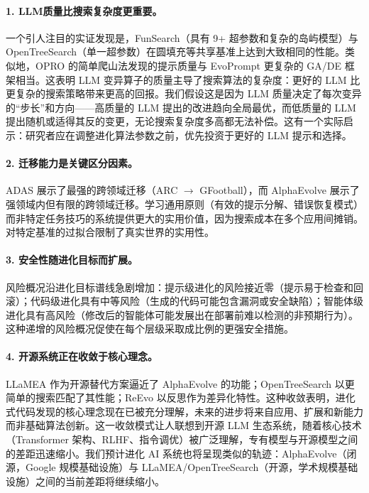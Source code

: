 \paragraph{1. LLM质量比搜索复杂度更重要。}
一个引人注目的实证发现是，FunSearch（具有 9+ 超参数和复杂的岛屿模型）与 OpenTreeSearch（单一超参数）在圆填充等共享基准上达到大致相同的性能。类似地，OPRO 的简单爬山法发现的提示质量与 EvoPrompt 更复杂的 GA/DE 框架相当。这表明 LLM 变异算子的质量主导了搜索算法的复杂度：更好的 LLM 比更复杂的搜索策略带来更高的回报。我们假设这是因为 LLM 质量决定了每次变异的``步长''和方向——高质量的 LLM 提出的改进趋向全局最优，而低质量的 LLM 提出随机或适得其反的变更，无论搜索复杂度多高都无法补偿。这有一个实际启示：研究者应在调整进化算法参数之前，优先投资于更好的 LLM 提示和选择。

\paragraph{2. 迁移能力是关键区分因素。}
ADAS 展示了最强的跨领域迁移（ARC $\rightarrow$ GFootball），而 AlphaEvolve 展示了强领域内但有限的跨领域迁移。学习通用原则（有效的提示分解、错误恢复模式）而非特定任务技巧的系统提供更大的实用价值，因为搜索成本在多个应用间摊销。对特定基准的过拟合限制了真实世界的实用性。

\paragraph{3. 安全性随进化目标而扩展。}
风险概况沿进化目标谱线急剧增加：提示级进化的风险接近零（提示易于检查和回滚）；代码级进化具有中等风险（生成的代码可能包含漏洞或安全缺陷）；智能体级进化具有高风险（修改后的智能体可能发展出在部署前难以检测的非预期行为）。这种递增的风险概况促使在每个层级采取成比例的更强安全措施。

\paragraph{4. 开源系统正在收敛于核心理念。}
LLaMEA 作为开源替代方案逼近了 AlphaEvolve 的功能；OpenTreeSearch 以更简单的搜索匹配了其性能；ReEvo 以反思作为差异化特性。这种收敛表明，进化式代码发现的核心理念现在已被充分理解，未来的进步将来自应用、扩展和新能力而非基础算法创新。这一收敛模式让人联想到开源 LLM 生态系统，随着核心技术（Transformer 架构、RLHF、指令调优）被广泛理解，专有模型与开源模型之间的差距迅速缩小。我们预计进化 AI 系统也将呈现类似的轨迹：AlphaEvolve（闭源，Google 规模基础设施）与 LLaMEA/OpenTreeSearch（开源，学术规模基础设施）之间的当前差距将继续缩小。

